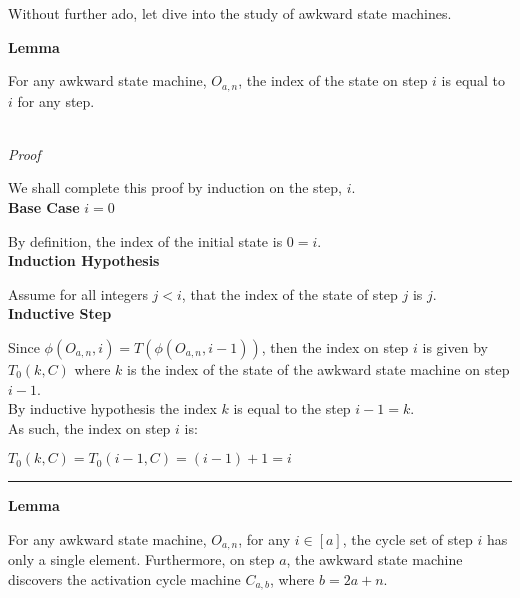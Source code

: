 \documentclass[a4paper,12pt]{article}
\begin{document}
\noindent Without further ado, let dive into the study of awkward state machines.\\






\label{lemma:index_is_step}
\hypertarget{lemma:index_is_step}{}
\begin{tcolorbox}
\textbf{Lemma}

For any awkward state machine, $O_{a, n}$, the index of the state on step $i$ is equal to $i$ for any step.
\end{tcolorbox}

\noindent \\
\textit{Proof}

\noindent We shall complete this proof by induction on the step, $i$.\\

\noindent
\textbf{Base Case} $i = 0$

\noindent By definition, the index of the initial state is $0 = i$.\\


\noindent
\textbf{Induction Hypothesis}

\noindent Assume for all integers $j < i$, that the index of the state of step $j$ is $j$.\\


\noindent
\textbf{Inductive Step}

\noindent Since $\phi(O_{a, n}, i) = T(\phi(O_{a, n}, i - 1))$, then the index on step $i$ is given by $T_0(k, C)$ where $k$ is the index of the state of the awkward state machine on step $i - 1$.\\

\noindent By inductive hypothesis the index $k$ is equal to the step $i - 1 = k$.\\

\noindent As such, the index on step $i$ is:
\begin{center}
$T_0(k, C) = T_0(i - 1, C) = (i - 1) + 1 = i$
\end{center}

\begin{center}
\noindent\rule{8cm}{0.4pt}
\end{center}













\label{lemma:2nd_cycle}
\hypertarget{lemma:2nd_cycle}{}
\begin{tcolorbox}
\textbf{Lemma}

\noindent For any awkward state machine, $O_{a, n}$, for any $i \in [a]$, the cycle set of step $i$ has only a single element. Furthermore, on step $a$, the awkward state machine discovers the activation cycle machine $C_{a, b}$, where $b = 2a + n$.
\end{tcolorbox}
\end{document}
